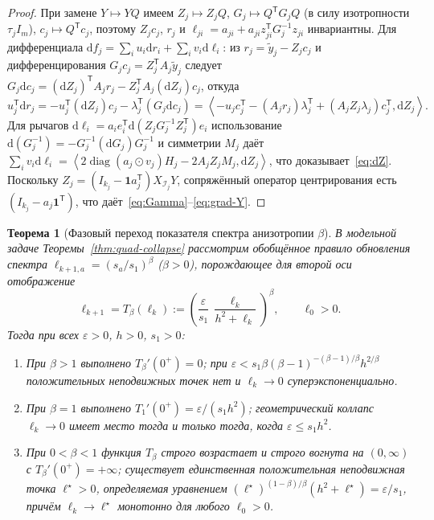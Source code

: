 \documentclass[11pt,a4paper]{article}
\numberwithin{equation}{section}
\newtheorem{theorem}{Теорема}[section]
\theoremstyle{definition}
\theoremstyle{remark}
\newcommand{\diag}{\operatorname{diag}}
\newcommand{\T}{^{\mathsf T}}
\newcommand{\ip}[2]{\left\langle #1, #2 \right\rangle}
\begin{document}
\begin{proof}
При замене $Y \mapsto Y Q$ имеем $Z_j \mapsto Z_j Q$, $G_j \mapsto Q\T G_j Q$ (в силу изотропности $\tau_j I_m$),
$c_j \mapsto Q\T c_j$, поэтому $Z_j c_j$, $r_j$ и $\ell_{ji} = a_{ji} + a_{ji} z_{ji}\T G_j^{-1} z_{ji}$ инвариантны.
Для дифференциала $\mathrm{d}f_j = \sum_i u_i \mathrm{d}r_i + \sum_i v_i \mathrm{d}\ell_i$:
из $r_j = \tilde{y}_j - Z_j c_j$ и дифференцирования $G_j c_j = Z_j\T A_j \tilde{y}_j$ следует
$G_j \mathrm{d}c_j = (\mathrm{d}Z_j)\T A_j r_j - Z_j\T A_j (\mathrm{d}Z_j) c_j$, откуда
\[
  u_j\T \mathrm{d}r_j = -u_j\T (\mathrm{d}Z_j) c_j - \lambda_j\T (G_j \mathrm{d}c_j)
  = \ip{-u_j c_j\T - (A_j r_j)\lambda_j\T + (A_j Z_j \lambda_j) c_j\T}{\mathrm{d}Z_j}.
\]
Для рычагов $\mathrm{d}\ell_i = a_i e_i\T \mathrm{d}(Z_j G_j^{-1} Z_j\T) e_i$ использование
$\mathrm{d}(G_j^{-1}) = -G_j^{-1}(\mathrm{d}G_j)G_j^{-1}$ и симметрии $M_j$ даёт
$\sum_i v_i \mathrm{d}\ell_i = \ip{2 \diag(a_j \odot v_j) H_j - 2 A_j Z_j M_j}{\mathrm{d}Z_j}$, что доказывает~\eqref{eq:dZ}.
Поскольку $Z_j = (I_{k_j} - \mathbf{1} a_j\T) X_{\mathcal{I}_j} Y$, сопряжённый оператор центрирования
есть $(I_{k_j} - a_j \mathbf{1}\T)$, что даёт~\eqref{eq:Gamma}--\eqref{eq:grad-Y}.
\end{proof}

\begin{theorem}[Фазовый переход показателя спектра анизотропии $\beta$]
\label{thm:beta-phase}
В модельной задаче Теоремы~\ref{thm:quad-collapse} рассмотрим обобщённое правило обновления спектра
$\ell_{k+1,a} = (s_a / s_1)^\beta$ ($\beta > 0$), порождающее для второй оси отображение
\[
  \ell_{k+1} = T_\beta(\ell_k) := \left(\frac{\varepsilon}{s_1}\,\frac{\ell_k}{h^2 + \ell_k}\right)^\beta,
  \qquad \ell_0 > 0.
\]
Тогда при всех $\varepsilon > 0$, $h > 0$, $s_1 > 0$:
\begin{enumerate}[label=(\alph*)]
  \item При $\beta > 1$ выполнено $T_\beta'(0^+) = 0$; при $\varepsilon < s_1 \beta (\beta-1)^{-(\beta-1)/\beta} h^{2/\beta}$
  положительных неподвижных точек нет и $\ell_k \to 0$ суперэкспоненциально.
  \item При $\beta = 1$ выполнено $T_1'(0^+) = \varepsilon / (s_1 h^2)$; геометрический коллапс $\ell_k \to 0$
  имеет место тогда и только тогда, когда $\varepsilon \le s_1 h^2$.
  \item При $0 < \beta < 1$ функция $T_\beta$ строго возрастает и строго вогнута на $(0, \infty)$ с
  $T_\beta'(0^+) = +\infty$; существует единственная положительная неподвижная точка $\ell^\star > 0$,
  определяемая уравнением $(\ell^\star)^{(1-\beta)/\beta}(h^2 + \ell^\star) = \varepsilon / s_1$,
  причём $\ell_k \to \ell^\star$ монотонно для любого $\ell_0 > 0$.
\end{enumerate}
\end{theorem}
\end{document}
